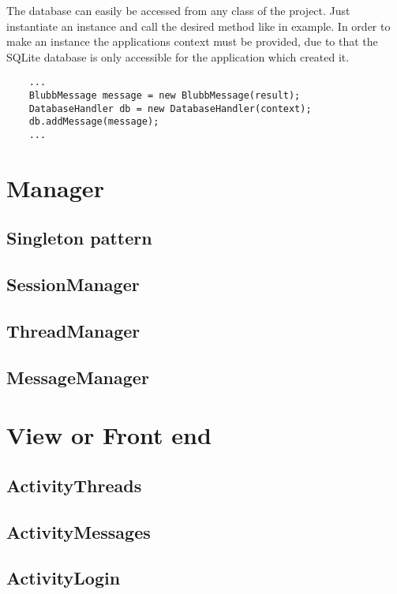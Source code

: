 \documentclass[12pt,a4paper,oneside]{report}
\begin{document}
The database can easily be accessed from any class of the project. Just instantiate an instance and call the desired method like in example. In order to make an instance the applications context must be provided, due to that the SQLite database is only accessible for the application which created it.
\begin{lstlisting}
	...
	BlubbMessage message = new BlubbMessage(result);
	DatabaseHandler db = new DatabaseHandler(context);
	db.addMessage(message);
	...
\end{lstlisting}


\section{Manager}

\subsection{Singleton pattern}

\subsection{SessionManager}

\subsection{ThreadManager}

\subsection{MessageManager}

\section{View or Front end}

\subsection{ActivityThreads}

\subsection{ActivityMessages}

\subsection{ActivityLogin}
\end{document}
